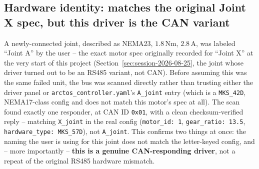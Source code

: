 \documentclass[11pt,letterpaper]{article}
\begin{document}
\subsection{Hardware identity: matches the original Joint X spec, but this driver is the CAN variant}
A newly-connected joint, described as NEMA23, $1.8\,\mathrm{Nm}$, $2.8\,\mathrm{A}$, was labeled ``Joint A'' by the user -- the exact motor spec originally recorded for ``Joint X'' at the very start of this project (Section~\ref{sec:session-2026-08-25}, the joint whose driver turned out to be an RS485 variant, not CAN). Before assuming this was the same failed unit, the bus was scanned directly rather than trusting either the driver panel or \texttt{arctos\_controller.yaml}'s \texttt{A\_joint} entry (which is a \texttt{MKS\_42D}, NEMA17-class config and does not match this motor's spec at all). The scan found exactly one responder, at CAN ID \texttt{0x01}, with a clean checksum-verified reply -- matching \texttt{X\_joint} in the real config (\texttt{motor\_id: 1}, \texttt{gear\_ratio: 13.5}, \texttt{hardware\_type: MKS\_57D}), not \texttt{A\_joint}. This confirms two things at once: the naming the user is using for this joint does not match the letter-keyed config, and -- more importantly -- \textbf{this is a genuine CAN-responding driver}, not a repeat of the original RS485 hardware mismatch.
\end{document}
